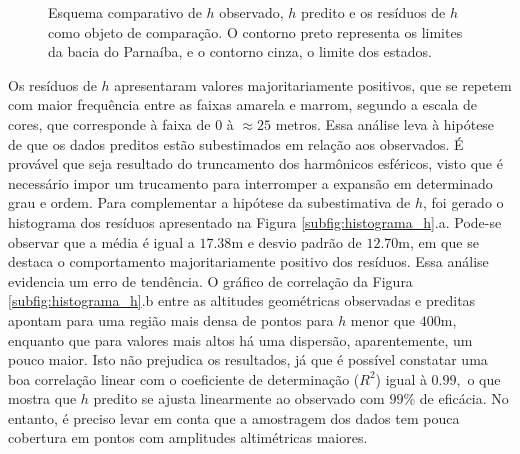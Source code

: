 \begin{figure}[H]
	\caption{Esquema comparativo de $h$ observado, $h$ predito e os resíduos de $h$ como objeto de comparação. O contorno preto representa os limites da bacia do Parnaíba, e o contorno cinza, o limite dos estados.}  
	\label{subfig:residuos_h}
\end{figure}

Os resíduos de $h$ apresentaram valores majoritariamente positivos, que se repetem com maior frequência  entre as faixas amarela e marrom, segundo a escala de cores, que corresponde à faixa de $0$ à $\approx25$ metros. Essa análise leva à hipótese de que os dados preditos estão subestimados em relação aos observados. É provável que seja resultado do truncamento dos harmônicos esféricos, visto que é necessário impor um trucamento para interromper a expansão em determinado grau e ordem. Para complementar a hipótese da subestimativa de $h$, foi gerado o histograma dos resíduos apresentado na Figura \ref{subfig:histograma_h}.a. Pode-se observar que a média é igual a $17.38$m e desvio padrão de $12.70$m, em que se destaca o comportamento majoritariamente positivo dos resíduos. Essa análise evidencia um erro de tendência. O gráfico de correlação da Figura \ref{subfig:histograma_h}.b entre as altitudes geométricas observadas e preditas apontam para uma região mais densa de pontos para $h$ menor que $400$m, enquanto que para valores mais altos há uma dispersão, aparentemente,  um pouco maior. Isto não prejudica os resultados, já que é possível constatar uma boa correlação linear com o coeficiente de determinação ($R^{2}$) igual à $0.99,$ o que mostra que $h$ predito se ajusta linearmente ao observado com $99$\% de eficácia. No entanto, é preciso levar em conta que a amostragem dos dados tem pouca cobertura em pontos com amplitudes altimétricas maiores. 

